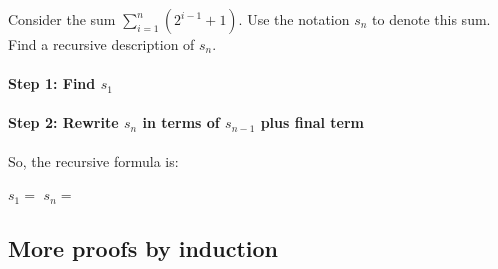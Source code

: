 \documentclass[a4paper,12pt]{book}
\newcounter{question}
\begin{document}
        \begin{questionNOGRADE}{\thequestion}

            Consider the sum $\sum_{i=1}^{n} (2^{i-1}+1)$. Use the notation
            $s_{n}$ to denote this sum. Find a recursive description of $s_{n}$.

            \paragraph{Step 1: Find $s_{1}$}


            \paragraph{Step 2: Rewrite $s_{n}$ in terms of $s_{n-1}$ plus final term}
            

            So, the recursive formula is:

            \begin{framed}
                $s_{1} = $ 
                \tab[4cm]
                $s_{n} = $ 
            \end{framed}
            
        \end{questionNOGRADE}

        \subsection{More proofs by induction}
\end{document}
